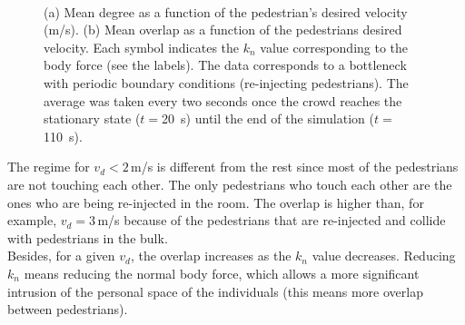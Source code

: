 \documentclass[preprint,12pt]{elsarticle}
\begin{document}
\begin{figure}[!htbp]
\centering
    \ 
    \\
\caption[width=0.47\columnwidth]{(a) Mean degree as a function of the pedestrian’s desired velocity (m/s). (b) Mean overlap as a function of the pedestrians desired velocity. Each symbol indicates the $k_n$ value corresponding to the body force (see the labels). The data corresponds to a bottleneck with periodic boundary conditions (re-injecting pedestrians). The average was taken every two seconds once the crowd reaches the stationary state ($t=$20~s) until the end of the simulation ($t=$110~s).}
\label{degree_overlap_vd}
\end{figure}

The regime for $v_d<2\,$m/s is different from the rest since most of the 
pedestrians are not touching each other. The only pedestrians who touch each 
other are the ones who are being re-injected in the room. The overlap is higher 
than, for example, $v_d=3\,$m/s because of the pedestrians that 
are re-injected and collide with pedestrians in the bulk. \\

Besides, for a given $v_d$, the overlap increases as the $k_n$ value decreases. 
Reducing $k_n$ means reducing the normal body force, which allows a more 
significant intrusion of the personal space of the individuals 
(this means more overlap between pedestrians).\\  
\end{document}
